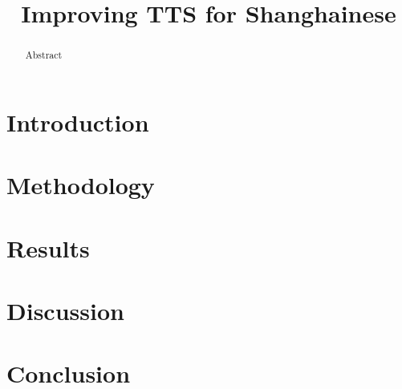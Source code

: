 \documentclass[11pt, a4paper]{article}
\title{Improving TTS for Shanghainese}
\date{}
\begin{document}
\maketitle

\begin{abstract}
Abstract
\end{abstract}

\section{Introduction}

\section{Methodology}

\section{Results}

\section{Discussion}

\section{Conclusion}
\end{document}
